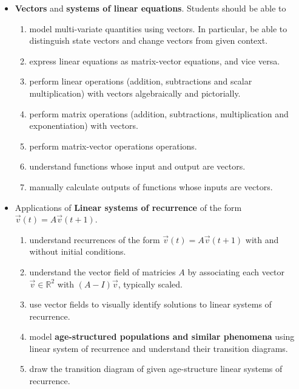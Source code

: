 \documentclass[../main.tex]{subfiles}
\begin{document}
\begin{itemize}
   \item \textbf{Vectors} and \textbf{systems of linear equations}. Students should be able to
     \begin{enumerate}
       \item model multi-variate quantities using vectors.  In particular, be able to distinguish state vectors and change vectors from given context.
       \item express linear equations as matrix-vector equations, and vice versa.
       \item perform linear operations (addition, subtractions and scalar multiplication) with vectors algebraically and pictorially.
       \item perform matrix operations (addition, subtractions, multiplication and exponentiation) with vectors.
       \item perform matrix-vector operations operations.
       \item understand functions whose input and output are vectors.
       \item manually calculate outputs of functions whose inputs are vectors.
     \end{enumerate}

   \item Applications of \textbf{Linear systems of recurrence} of the form \(\vec{v}(t) = A \vec{v}(t+1)\).
     \begin{enumerate}
       \item understand recurrences of the form \(\vec{v}(t) = A \vec{v}(t+1)\) with and without initial conditions.
       \item understand the vector field of matricies \(A\) by associating each vector \(\vec{v} \in \mathbb{R}^{2}\) with \((A - I) \vec{v}\), typically scaled.
       \item use vector fields to visually identify solutions to linear systems of recurrence.
       \item model \textbf{age-structured populations and similar phenomena} using linear system of recurrence and understand their transition diagrams.
       \item draw the transition diagram of given age-structure linear systems of recurrence.
     \end{enumerate}


\end{itemize}
\end{document}
